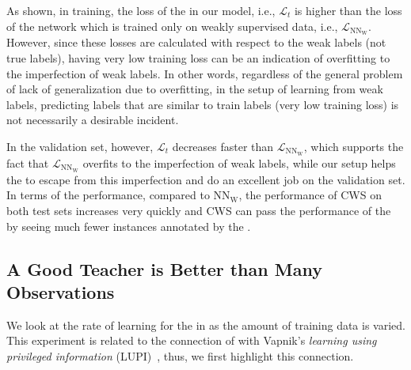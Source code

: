 As shown, in training, the loss of the \tnet in our model, i.e., $\mathcal{L}_t$ is higher than the loss of the network which is trained only on weakly supervised data, i.e., $\mathcal{L}_{\text{NN}_{\text{W}}}$. 
%
However, since these losses are calculated with respect to the weak labels (not true labels), having very low training loss can be an indication of overfitting to the imperfection of weak labels. 
%
In other words, regardless of the general problem of lack of generalization due to overfitting, in the setup of learning from weak labels, predicting labels that are similar to train labels (very low training loss) is not necessarily a desirable incident. 

In the validation set, however, $\mathcal{L}_t$ decreases faster than $\mathcal{L}_{\text{NN}_{\text{W}}}$, which supports the fact that $\mathcal{L}_{\text{NN}_{\text{W}}}$ overfits to the imperfection of weak labels, while our setup helps the \tnet to escape from this imperfection and do an excellent job on the validation set.
%
In terms of the performance, compared to $\text{NN}_{\text{W}}$, the performance of CWS on both test sets increases very quickly and CWS can pass the performance of the \wa by seeing much fewer instances annotated by the \wa.
\subsection{A Good Teacher is Better than Many Observations} 

We look at the rate of learning for the \std in \fwl as the amount of training data is varied. This experiment is related to the connection of \fwl with Vapnik's \emph{learning using privileged information} (LUPI)~\citep{vapnik2009new, vapnik2015learning}, thus,  we first  highlight this connection.

